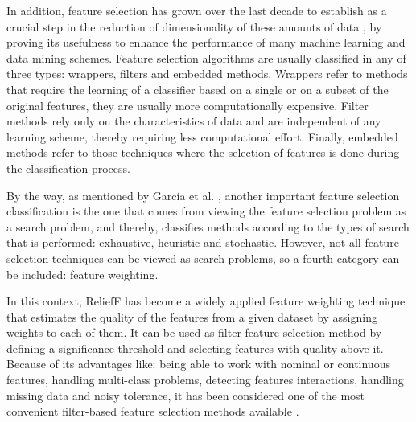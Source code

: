 In addition, feature selection has grown over the last decade to establish as a crucial step in the reduction of dimensionality of these amounts of data \cite{Bolon-Canedo2015a}, by proving its usefulness to enhance the performance of many machine learning and data mining schemes. Feature selection algorithms are usually classified in any of three types: wrappers, filters and embedded methods. Wrappers refer to methods that require the learning of a classifier based on a single or on a subset of the original features, they are usually more computationally expensive. Filter methods rely only on the characteristics of data and are independent of any learning scheme, thereby requiring less computational effort. Finally, embedded methods refer to those techniques where the selection of features is done during the classification process. 

By the way, as mentioned by Garc\'ia et al. \cite{García2015}, another important feature selection classification is the one that comes from viewing the feature selection problem as a search problem, and thereby, classifies methods according to the types of search that is performed: exhaustive, heuristic and stochastic. However, not all feature selection techniques can be viewed as search problems, so a fourth category can be included: feature weighting.

In this context, ReliefF \cite{Kononenko1994} has become a widely applied feature weighting technique that estimates the quality of the features from a given dataset by assigning weights to each of them. It can be used as filter feature selection method by defining a significance threshold and selecting features with quality above it. Because of its advantages like: being able to work with nominal or continuous features, handling multi-class problems, detecting features interactions, handling missing data and noisy tolerance, it has been considered one of the most convenient filter-based feature selection methods available \cite{Bolón-Canedo2012}.

